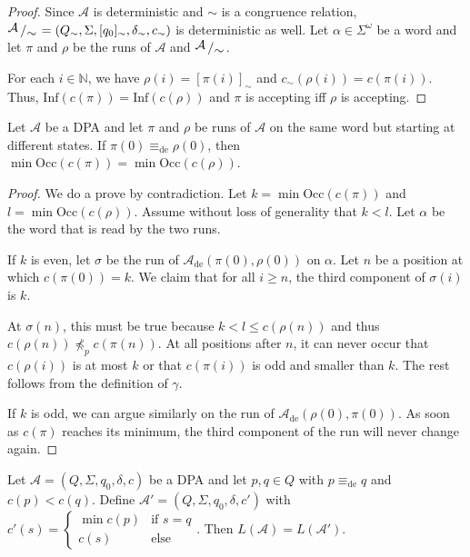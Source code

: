 \begin{proof}
	Since $\mathcal{A}$ is deterministic and $\sim$ is a congruence relation, $\bigslant{\mathcal{A}}{\sim} = (Q_\sim, \Sigma, [q_0]_\sim, \delta_\sim, c_\sim)$ is deterministic as well. Let $\alpha \in \Sigma^\omega$ be a word and let $\pi$ and $\rho$ be the runs of $\mathcal{A}$ and $\bigslant{\mathcal{A}}{\sim}$. 
		
	For each $i \in \mathbb{N}$, we have $\rho(i) = [\pi(i)]_\sim$ and $c_\sim(\rho(i)) = c(\pi(i))$. Thus, $\text{Inf}(c(\pi)) = \text{Inf}(c(\rho))$ and $\pi$ is accepting iff $\rho$ is accepting.
\end{proof}

\begin{lem}
\label{lem:fritzwilke:equiv_states_same_minpri}
	Let $\mathcal{A}$ be a DPA and let $\pi$ and $\rho$ be runs of $\mathcal{A}$ on the same word but starting at different states. If $\pi(0) \equiv_\text{de} \rho(0)$, then $\min \text{Occ}(c(\pi)) = \min \text{Occ}(c(\rho))$.
\end{lem}

\begin{proof}
	We do a prove by contradiction. Let $k = \min \text{Occ}(c(\pi))$ and $l = \min \text{Occ}(c(\rho))$. Assume without loss of generality that $k < l$. Let $\alpha$ be the word that is read by the two runs.
	
	If $k$ is even, let $\sigma$ be the run of $\mathcal{A}_\text{de}(\pi(0), \rho(0))$ on $\alpha$. Let $n$ be a position at which $c(\pi(0)) = k$. We claim that for all $i \geq n$, the third component of $\sigma(i)$ is $k$.
	
	At $\sigma(n)$, this must be true because $k < l \leq c(\rho(n))$ and thus $c(\rho(n)) \not\preceq_p c(\pi(n))$. At all positions after $n$, it can never occur that $c(\rho(i))$ is at most $k$ or that $c(\pi(i))$ is odd and smaller than $k$. The rest follows from the definition of $\gamma$.
	
	If $k$ is odd, we can argue similarly on the run of $\mathcal{A}_\text{de}(\rho(0), \pi(0))$. As soon as $c(\pi)$ reaches its minimum, the third component of the run will never change again.
\end{proof}

\begin{theorem}
	Let $\mathcal{A} = (Q, \Sigma, q_0, \delta, c)$ be a DPA and let $p, q \in Q$ with $p \equiv_\text{de} q$ and $c(p) < c(q)$. Define $\mathcal{A}' = (Q, \Sigma, q_0, \delta, c')$ with $c'(s) = \begin{cases} \min c(p) & \text{if } s = q \\ c(s) & \text{else} \end{cases}$. Then $L(\mathcal{A}) = L(\mathcal{A}')$.
\end{theorem}

